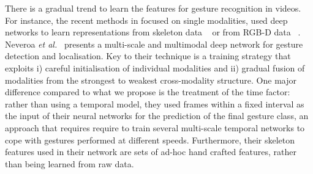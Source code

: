 There is a gradual trend to learn the features for gesture recognition in videos.
%
For instance, the recent methods in \cite{wu2014deep,lio2014deep} focused on single modalities,
used deep networks to learn representations from skeleton data ~\cite{wu2014deep} or from RGB-D data ~\cite{lio2014deep}.
%
Neveroa \emph{et al.}~\cite{neverova2014multi} presents a multi-scale and multimodal deep network for gesture detection and localisation.
Key to their technique is a training strategy that exploits i) careful initialisation of individual modalities and ii) gradual fusion of modalities from the strongest to weakest cross-modality structure.
%
One major difference compared to what we propose is the treatment of the time factor:
rather than using a temporal model, they used frames within a fixed interval as the input of their neural networks
for the prediction of the final gesture class, an approach that
requires require to train several multi-scale temporal networks  to cope with gestures performed at different speeds.
%
Furthermore, their skeleton features used in their network are sets of ad-hoc hand crafted features, rather than being
learned from raw data.


\endinput
